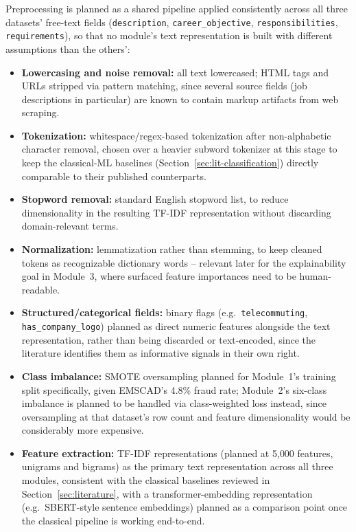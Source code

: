 \documentclass[11pt,a4paper]{article}
\begin{document}
Preprocessing is planned as a shared pipeline applied consistently across all three
datasets' free-text fields (\texttt{description}, \texttt{career\_objective},
\texttt{responsibilities}, \texttt{requirements}), so that no module's text
representation is built with different assumptions than the others':

\begin{itemize}
    \item \textbf{Lowercasing and noise removal:} all text lowercased; HTML tags and
    URLs stripped via pattern matching, since several source fields (job descriptions in
    particular) are known to contain markup artifacts from web scraping.
    \item \textbf{Tokenization:} whitespace/regex-based tokenization after
    non-alphabetic character removal, chosen over a heavier subword tokenizer at this
    stage to keep the classical-ML baselines (Section~\ref{sec:lit-classification})
    directly comparable to their published counterparts.
    \item \textbf{Stopword removal:} standard English stopword list, to reduce
    dimensionality in the resulting TF-IDF representation without discarding
    domain-relevant terms.
    \item \textbf{Normalization:} lemmatization rather than stemming, to keep cleaned
    tokens as recognizable dictionary words -- relevant later for the explainability
    goal in Module~3, where surfaced feature importances need to be human-readable.
    \item \textbf{Structured/categorical fields:} binary flags (e.g.\
    \texttt{telecommuting}, \texttt{has\_company\_logo}) planned as direct numeric
    features alongside the text representation, rather than being discarded or
    text-encoded, since the literature identifies them as informative signals in their
    own right.
    \item \textbf{Class imbalance:} SMOTE oversampling planned for Module~1's training
    split specifically, given EMSCAD's 4.8\% fraud rate; Module~2's six-class imbalance
    is planned to be handled via class-weighted loss instead, since oversampling at that
    dataset's row count and feature dimensionality would be considerably more expensive.
    \item \textbf{Feature extraction:} TF-IDF representations (planned at 5{,}000
    features, unigrams and bigrams) as the primary text representation across all three
    modules, consistent with the classical baselines reviewed in
    Section~\ref{sec:literature}, with a transformer-embedding representation
    (e.g.\ SBERT-style sentence embeddings) planned as a comparison point once the
    classical pipeline is working end-to-end.
\end{itemize}
\end{document}

